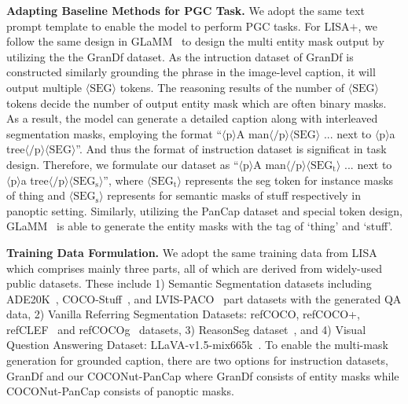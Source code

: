 \noindent\textbf{Adapting Baseline Methods for PGC Task.}
We adopt the same text prompt template to enable the model to perform PGC tasks. For LISA$+$, we follow the same design in GLaMM~\cite{hanoona2023GLaMM} to design the multi entity mask output by utilizing the the GranDf dataset. As the intruction dataset of GranDf is constructed similarly grounding the phrase in the image-level caption, it will output multiple $\langle \mathrm{SEG} \rangle$ tokens. The reasoning results of the number of $\langle \mathrm{SEG} \rangle$ tokens decide the number of output entity mask which are often binary masks. As a result, the model can generate a detailed caption along
with interleaved segmentation masks, employing the format ``$\langle \mathrm{p} \rangle$A man$\langle \mathrm{/p} \rangle$$\langle \mathrm{SEG} \rangle$ ... next to $\langle \mathrm{p} \rangle$a tree$\langle \mathrm{/p} \rangle$$\langle \mathrm{SEG} \rangle$''. And thus the format of instruction dataset is significat in task design. Therefore, we formulate our dataset as ``$\langle \mathrm{p} \rangle$A man$\langle \mathrm{/p} \rangle$$\langle \mathrm{SEG_t} \rangle$ ... next to $\langle \mathrm{p} \rangle$a tree$\langle \mathrm{/p} \rangle$$\langle \mathrm{SEG_s} \rangle$'', where $\langle \mathrm{SEG_t} \rangle$ represents the seg token for instance masks of thing and $\langle \mathrm{SEG_s} \rangle$ represents for semantic masks of stuff respectively in panoptic setting. Similarly, utilizing the PanCap dataset and special token design, GLaMM~\cite{hanoona2023GLaMM} is able to generate the entity masks with the tag of `thing' and `stuff'. 


\noindent\textbf{Training Data Formulation.} We adopt the same training data from LISA~\cite{lai2024lisa} which comprises mainly three parts, all of which are derived from widely-used public datasets. These include 1) Semantic Segmentation datasets including  ADE20K~\cite{zhou2017ade20k}, COCO-Stuff~\cite{caesar2018coco_stuff}, and LVIS-PACO~\cite{ramanathan2023paco} part datasets with the generated QA data, 2) Vanilla Referring Segmentation Datasets: refCOCO, refCOCO+, refCLEF~\cite{kazemzadeh2014refcoco} and refCOCOg~\cite{mao2016refcocog} datasets, 3) ReasonSeg dataset~\cite{lai2024lisa}, and 4) Visual Question Answering Dataset: LLaVA-v1.5-mix665k~\cite{liu2023improvedllava}. To enable the multi-mask generation for grounded caption, there are two options for instruction datasets, GranDf and our COCONut-PanCap where GranDf consists of entity masks while COCONut-PanCap consists of panoptic masks. 




